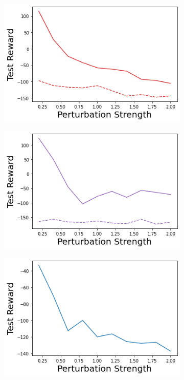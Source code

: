 \begin{figure}
    \begin{subfigure}{.24\textwidth}
        \includegraphics[width=\textwidth]{sections/011_icml2022/resources/state_shift-DropOut-LunarLanderShift-v0-mean_reward_.png}
    \end{subfigure}
    \begin{subfigure}{.24\textwidth}
        \includegraphics[width=\textwidth]{sections/011_icml2022/resources/state_shift-Ensemble-LunarLanderShift-v0-mean_reward_.png}
    \end{subfigure}
    \begin{subfigure}{.24\textwidth}
        \includegraphics[width=\textwidth]{sections/011_icml2022/resources/state_shift-DKL-LunarLanderShift-v0-mean_reward_.png}

\end{subfigure}
\end{figure}
